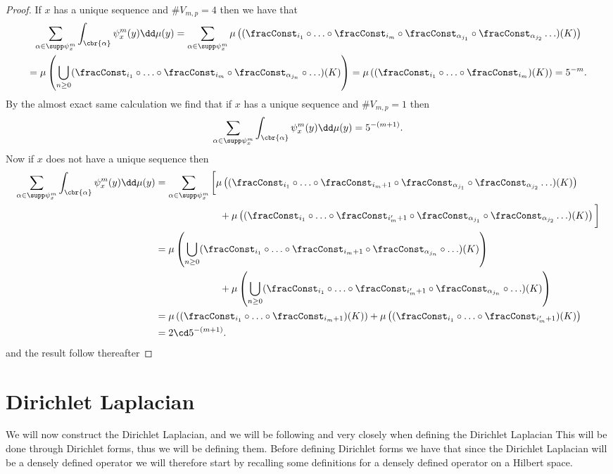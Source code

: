 \begin{proof}
 If $x$ has a unique sequence and $\# V_{m,p} = 4$ then we have that
\begin{multline}
	\sum_{\alpha \in \supp \psi_{x}^{m}} \int_{\cbr{\alpha}} \psi_{x}^{m}(y) \dd \mu(y) = \sum_{\alpha \in \supp \psi_{x}^{m}} \mu\left((\fracConst_{i_1} \circ \ldots \circ \fracConst_{i_m} \circ \fracConst_{\alpha_{j_1}} \circ \fracConst_{\alpha_{j_2}} \ldots)(K) \right) \\
	= \mu\left(\bigcup_{n \geq 0} (\fracConst_{i_1} \circ \ldots \circ \fracConst_{i_m} \circ \fracConst_{\alpha_{j_n}} \circ \ldots)(K)\right) = \mu \left((\fracConst_{i_1} \circ \ldots \circ \fracConst_{i_m})(K)\right) = 5^{-m}.
\end{multline}
By the almost exact same calculation we find that if $x$ has a unique sequence and $\# V_{m,p} = 1$ then 
\begin{equation}
	\sum_{\alpha \in \supp \psi_{x}^{m}} \int_{\cbr{\alpha}} \psi_{x}^{m}(y) \dd \mu(y) = 5^{-(m+1)}.
\end{equation}
Now if $x$ does not have a unique sequence then
\begin{align}
		\sum_{\alpha \in \supp \psi_{x}^{m}} \int_{\cbr{\alpha}} \psi_{x}^{m}(y) \dd \mu(y) &= \sum_{\alpha \in \supp \psi_{x}^{m}} \bigg[ \mu\left((\fracConst_{i_1} \circ \ldots \circ \fracConst_{i_m+1} \circ \fracConst_{\alpha_{j_1}} \circ \fracConst_{\alpha_{j_2}} \ldots)(K) \right) \\
		&\phantom{a} \qquad \qquad \qquad + \mu\left((\fracConst_{i_1} \circ \ldots \circ \fracConst_{i_m'+1} \circ \fracConst_{\alpha_{j_1}} \circ \fracConst_{\alpha_{j_2}} \ldots)(K) \right) \bigg] \\
		&= \mu\left(\bigcup_{n \geq 0} (\fracConst_{i_1} \circ \ldots \circ \fracConst_{i_m+1} \circ \fracConst_{\alpha_{j_n}} \circ \ldots)(K)\right)\\
		&\phantom{a} \qquad \qquad \qquad + \mu\left(\bigcup_{n \geq 0} (\fracConst_{i_1} \circ \ldots \circ \fracConst_{i_m'+1} \circ \fracConst_{\alpha_{j_n}} \circ \ldots)(K)\right) \\
		&= \mu \left((\fracConst_{i_1} \circ \ldots \circ \fracConst_{i_m+1})(K)\right) + \mu \left((\fracConst_{i_1} \circ \ldots \circ \fracConst_{i_m'+1})(K)\right)\\
		&= 2\cd 5^{-(m+1)}.
\end{align}
and the result follow thereafter
\end{proof}
\section{Dirichlet Laplacian}\label{constructDirichletLaplacian}
We will now construct the Dirichlet Laplacian, and we will be following \cite{Fabrice} and \cite{specAnal} very closely when defining the Dirichlet Laplacian This will be done through Dirichlet forms, thus we will be defining them. Before defining Dirichlet forms we have that since the Dirichlet Laplacian will be a densely defined operator we will therefore start by recalling some definitions for a densely defined operator on a Hilbert space.

